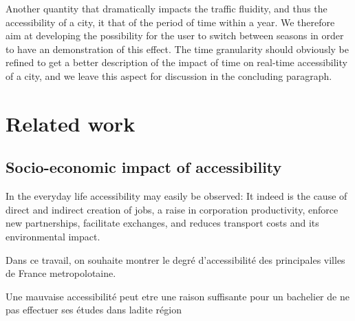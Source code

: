 \documentclass{vgtc}                          %
\begin{document}
\vspace{0.3cm}

 Another quantity that dramatically impacts the traffic fluidity, and thus the accessibility of a city, it that of the period of time within a year. We therefore aim at developing the possibility for the user to switch between seasons in order to have an demonstration of this effect. The time granularity should obviously be refined to get a better description of the impact of time on real-time accessibility of a city, and we leave this aspect for discussion in the concluding paragraph. 


\vspace{0.3cm}
\section{Related work}

\vspace{0.3cm}


\subsection{Socio-economic impact of accessibility}

\vspace{0.3cm}



In the everyday life accessibility may easily be observed: It indeed is the cause of direct and indirect creation of jobs, a raise in corporation productivity, enforce new partnerships, facilitate exchanges, and reduces transport costs and its environmental impact.



Dans ce travail, on souhaite montrer le degré d'accessibilité des principales villes de France metropolotaine. 

Une mauvaise accessibilité peut etre une raison suffisante pour un bachelier de ne pas effectuer ses études dans ladite région
\end{document}
